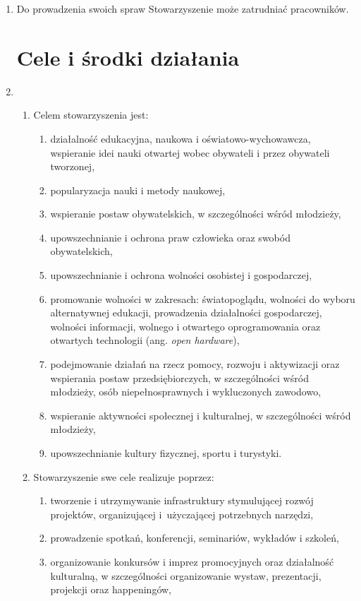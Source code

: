 \documentclass[chapterprefix,notitlepage]{article}
\begin{document}
\begin{enumerate}
	\item Do prowadzenia swoich spraw Stowarzyszenie może zatrudniać pracowników.
	
	
\section{Cele i środki działania}

	\item \begin{enumerate}
		\item Celem stowarzyszenia jest:
		\begin{enumerate}
			\item działalność edukacyjna, naukowa i oświatowo-wychowawcza, wspieranie idei nauki otwartej wobec obywateli i przez obywateli tworzonej,
			\item popularyzacja nauki i metody naukowej,
			\item wspieranie postaw obywatelskich, w szczególności wśród młodzieży,
			\item upowszechnianie i ochrona praw człowieka oraz swobód obywatelskich,
			\item upowszechnianie i ochrona wolności osobistej i gospodarczej,
			\item promowanie wolności w zakresach: światopoglądu, wolności do wyboru alternatywnej edukacji, prowadzenia działalności gospodarczej, wolności informacji, wolnego i otwartego oprogramowania oraz otwartych technologii (ang. \textit{open hardware}),
			\item podejmowanie działań na rzecz pomocy, rozwoju i aktywizacji oraz wspierania postaw przedsiębiorczych, w szczególności wśród młodzieży, osób niepełnosprawnych i wykluczonych zawodowo,
			\item wspieranie aktywności społecznej i kulturalnej, w szczególności wśród młodzieży,
			\item upowszechnianie kultury fizycznej, sportu i turystyki.
		\end{enumerate}
		\item Stowarzyszenie swe cele realizuje poprzez:
		\begin{enumerate}
			\item tworzenie i utrzymywanie infrastruktury stymulującej rozwój projektów, organizującej i~użyczającej potrzebnych narzędzi,
			\item prowadzenie spotkań, konferencji, seminariów, wykładów i szkoleń,
			\item organizowanie konkursów i imprez promocyjnych oraz działalność kulturalną, w szczególności organizowanie wystaw, prezentacji, projekcji oraz happeningów,

\end{enumerate}
\end{enumerate}
\end{enumerate}
\end{document}
